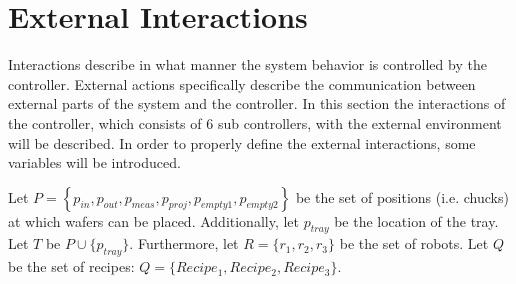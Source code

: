 \section{External Interactions}
Interactions describe in what manner the system behavior is controlled by the controller.
External actions specifically describe the communication between external parts of the system and the controller.
In this section the interactions of the controller, which consists of $6$ sub controllers, with the external environment will be described.
In order to properly define the external interactions, some variables will be introduced.

Let $P = \left\{p_\mathit{in}, p_\mathit{out}, p_\mathit{meas}, p_\mathit{proj}, p_\mathit{empty1}, p_\mathit{empty2}\right\}$ be the set of positions (i.e. chucks) at which wafers can be placed.
Additionally, let $\mathit{p_\mathit{tray}}$ be the location of the tray.
Let $T$ be $P \cup \{p_\mathit{tray}\}$.
Furthermore, let $R = \{r_1,r_2,r_3\}$ be the set of robots.
Let $Q$ be the set of recipes: $Q = \{Recipe_1, Recipe_2, Recipe_3\}$.


